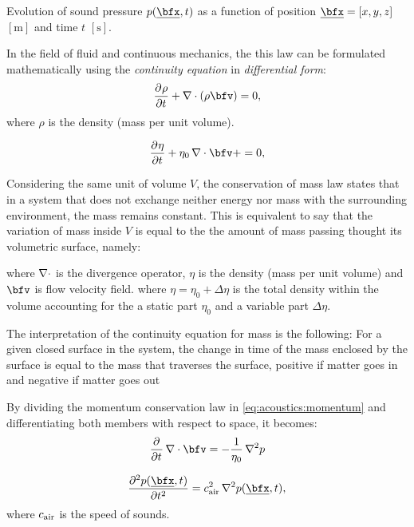 Evolution of sound pressure $\pressure (\positionMicrophone, t)$
as a function of position $\positionMicrophone = \klist{x, y, z}$ $[\si{\metre}]$ and time $t$ $[\si{\second}]$.


In the field of fluid and continuous mechanics, the this law can be formulated mathematically using the \textit{continuity equation} in \textit{differential form}:
\begin{equation}
    \kpderiv[]{\rho}{t} + \kdivergence{\kparen{\rho \bfv}} = 0
    ,
\end{equation}
where $\rho$ is the density (mass per unit volume).


\begin{equation}
    \kpderiv[]{\eta}{t} + \eta_0 \kdivergence{\bfv} + = 0
    ,
\end{equation}

Considering the same unit of volume $V$, the conservation of mass law states that in a system that does not exchange
neither energy nor mass with the surrounding environment, the mass remains constant.
This is equivalent to say that the variation of mass inside $V$ is equal to the the amount of mass passing thought its volumetric surface, namely:


where $\mathop{}\!\mathbin{\nabla}\cdot$ is the divergence operator, $\eta$ is the density (mass per unit volume) and $\bfv$ is flow velocity field.
where $\eta = \eta_0 + \Delta\eta$ is the total density within the volume accounting for the a static part $\eta_0$ and a variable part $\Delta\eta$.

The interpretation of the continuity equation for mass is the following: For a given closed surface in the system,
the change in time of the mass enclosed by the surface is equal to the mass that traverses the surface, positive if matter goes in and negative if matter goes out

By dividing the momentum conservation law in \cref{eq:acoustics:momentum} and differentiating both members with respect to space, it becomes:
\begin{equation}
    \kpderiv[]{}{t} \knabla\cdot \bfv = - \frac{1}{\volumeUnit} \knabla^2 p
\end{equation}



\begin{equation}
    \label{eq:acoustics:wave}
    \kpderiv[2]{\pressure(\positionMicrophone, t)}{t} = \cair^2 \knabla^2 \pressure(\positionMicrophone, t)
    ,
\end{equation}
where $c_\text{air}$ is the speed of sounds.

